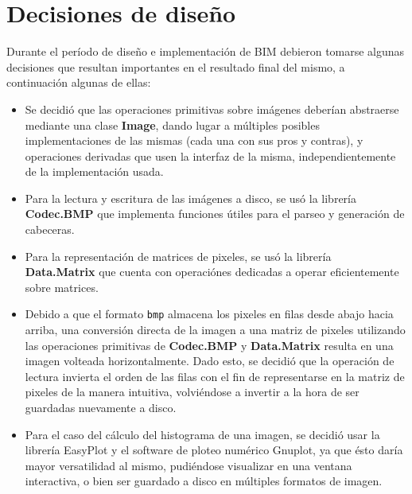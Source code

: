 \documentclass[a4paper, 11pt]{article} %
\begin{document}

\section*{Decisiones de diseño}

Durante el período de diseño e implementación de BIM debieron tomarse algunas decisiones que resultan importantes en el resultado final del mismo, a continuación algunas de ellas:
	
	\begin{itemize}
		\item Se decidió que las operaciones primitivas sobre imágenes deberían abstraerse mediante una clase \textbf{Image}, dando lugar a múltiples posibles implementaciones de las mismas (cada una con sus pros y contras), y operaciones derivadas que usen la interfaz de la misma, independientemente de la implementación usada.
		
		\item Para la lectura y escritura de las imágenes a disco, se usó la librería \textbf{Codec.BMP} que implementa funciones útiles para el parseo y generación de cabeceras.
		
		\item Para la representación de matrices de pixeles, se usó la librería \\ \textbf{Data.Matrix} que cuenta con operaciónes dedicadas a operar eficientemente sobre matrices.
	
		\item Debido a que el formato \texttt{bmp} almacena los pixeles en filas desde abajo hacia arriba, una conversión directa de la imagen a una matriz de pixeles utilizando las operaciones primitivas de \textbf{Codec.BMP} y \textbf{Data.Matrix} resulta en una imagen volteada horizontalmente. Dado esto, se decidió que la operación de lectura invierta el orden de las filas con el fin de representarse en la matriz de pixeles de la manera intuitiva, volviéndose a invertir a la hora de ser guardadas nuevamente a disco.	
		
		\item Para el caso del cálculo del histograma de una imagen, se decidió usar la librería EasyPlot y el software de ploteo numérico Gnuplot, ya que ésto daría mayor versatilidad al mismo, pudiéndose visualizar en una ventana interactiva, o bien ser guardado a disco en múltiples formatos de imagen.


\end{itemize}
\end{document}
